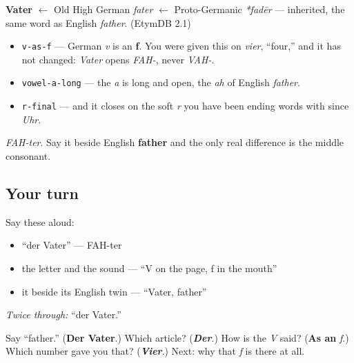 \begin{cousinweb}
\textbf{Vater} $\leftarrow$ Old High German \emph{fater} $\leftarrow$ Proto-Germanic \emph{*fadēr} — inherited, the same word as English \emph{father}. (EtymDB 2.1)
\end{cousinweb}

\begin{sounds}
\begin{itemize}
\raggedright
  \item \texttt{v-as-f} — German \emph{v} is an \textbf{f}. You were given this on \emph{vier}, \textquotedblleft{}four,\textquotedblright{} and it has not changed: \emph{Vater} opens \emph{FAH-}, never \emph{VAH-}.
  \item \texttt{vowel-a-long} — the \emph{a} is long and open, the \emph{ah} of English \emph{father}.
  \item \texttt{r-final} — and it closes on the soft \emph{r} you have been ending words with since \emph{Uhr}.
\end{itemize}

\emph{FAH-ter}. Say it beside English \textbf{father} and the only real difference is the middle consonant.
\end{sounds}

\subsection*{Your turn}
Say these aloud:

\begin{itemize}
\raggedright
  \item \textquotedblleft{}der Vater\textquotedblright{} — FAH-ter
  \item the letter and the sound — \textquotedblleft{}V on the page, f in the mouth\textquotedblright{}
  \item it beside its English twin — \textquotedblleft{}Vater, father\textquotedblright{}
\end{itemize}

\emph{Twice through:} \textquotedblleft{}der Vater.\textquotedblright{}

\begin{tcolorbox}[breakable,colback=teal!4,colframe=teal!35!black,title={Before you move on}]
Say \textquotedblleft{}father.\textquotedblright{} (\textbf{Der Vater}.) Which article? (\emph{\textbf{Der}}.) How is the \emph{V} said? (\textbf{As an} \emph{f}.) Which number gave you that? (\emph{\textbf{Vier}}.) Next: why that \emph{f} is there at all.
\end{tcolorbox}
